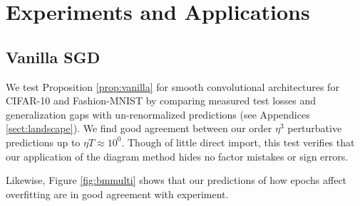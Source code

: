 \documentclass{article}
\theoremstyle{plain}
\theoremstyle{definition}
\newcommand{\lorem}[1]{
    Lorem ipsum dolor sit amet, consectetur adipiscing elit...\\
    \nopagebreak\vspace{#1cm} \ \\
    ...sunt in culpa qui officia deserunt mollit anim id est laborum.
}
\begin{document}

\section{Experiments and Applications}


    \subsection{Vanilla SGD}
        We test Proposition \ref{prop:vanilla} for smooth convolutional
        architectures for CIFAR-10 and Fashion-MNIST by comparing measured 
        test losses and generalization gaps with un-renormalized predictions
        (see Appendices \ref{sect:landscape}).  We find good
        agreement between our order $\eta^3$ perturbative predictions up to
        $\eta T \approx 10^0$.  Though of little direct import, this test
        verifies that our application of the diagram method hides no factor
        mistakes or sign errors.

 
        Likewise, Figure \ref{fig:bmmulti} shows that our predictions of how 
        epochs affect overfitting are in good agreement with experiment. 
    
\end{document}
